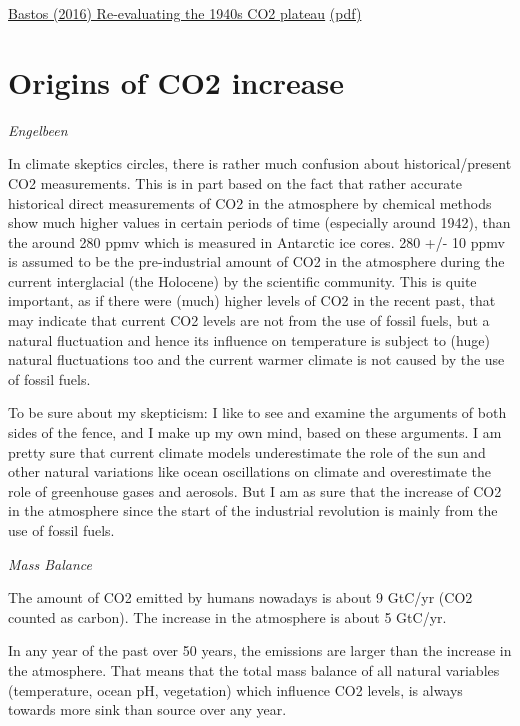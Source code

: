 \documentclass[
]{book}
\begin{document}
\href{https://bg.copernicus.org/articles/13/4877/2016/}{Bastos (2016) Re-evaluating the 1940s CO2 plateau}
\href{pdf/Bastos_2016_Revealutaing_1940s_CO2_plateau.pdf}{(pdf)}

\hypertarget{origins-of-co2-increase}{%
\section{Origins of CO2 increase}\label{origins-of-co2-increase}}

\emph{Engelbeen}

In climate skeptics circles, there is rather much confusion about historical/present CO2 measurements. This is in part based on the fact that rather accurate historical direct measurements of CO2 in the atmosphere by chemical methods show much higher values in certain periods of time (especially around 1942), than the around 280 ppmv which is measured in Antarctic ice cores. 280 +/- 10 ppmv is assumed to be the pre-industrial amount of CO2 in the atmosphere during the current interglacial (the Holocene) by the scientific community. This is quite important, as if there were (much) higher levels of CO2 in the recent past, that may indicate that current CO2 levels are not from the use of fossil fuels, but a natural fluctuation and hence its influence on temperature is subject to (huge) natural fluctuations too and the current warmer climate is not caused by the use of fossil fuels.

To be sure about my skepticism: I like to see and examine the arguments of both sides of the fence, and I make up my own mind, based on these arguments. I am pretty sure that current climate models underestimate the role of the sun and other natural variations like ocean oscillations on climate and overestimate the role of greenhouse gases and aerosols. But I am as sure that the increase of CO2 in the atmosphere since the start of the industrial revolution is mainly from the use of fossil fuels.

\emph{Mass Balance}

The amount of CO2 emitted by humans nowadays is about 9 GtC/yr (CO2 counted as carbon). The increase in the atmosphere is about 5 GtC/yr.

In any year of the past over 50 years, the emissions are larger than the increase in the atmosphere. That means that the total mass balance of all natural variables (temperature, ocean pH, vegetation) which influence CO2 levels, is always towards more sink than source over any year.
\end{document}
